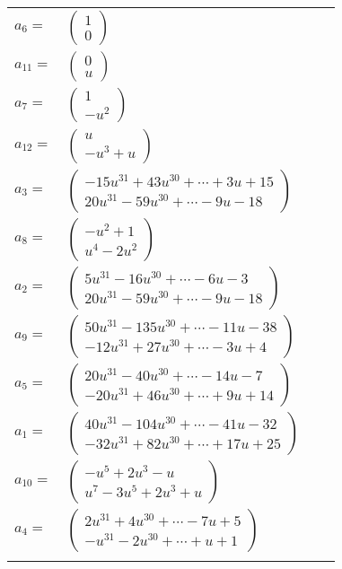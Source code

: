 \documentclass[1p]{elsarticle_modified}
\theoremstyle{definition}
\begin{document}
\begin{tabular}{m{7pt} m{180pt} m{7pt} m{180pt} }
\flushright $a_{6}=$&$\begin{pmatrix}1\\0\end{pmatrix}$ \\
\flushright $a_{11}=$&$\begin{pmatrix}0\\u\end{pmatrix}$ \\
\flushright $a_{7}=$&$\begin{pmatrix}1\\- u^2\end{pmatrix}$ \\
\flushright $a_{12}=$&$\begin{pmatrix}u\\- u^3+u\end{pmatrix}$ \\
\flushright $a_{3}=$&$\begin{pmatrix}-15 u^{31}+43 u^{30}+\cdots+3 u+15\\20 u^{31}-59 u^{30}+\cdots-9 u-18\end{pmatrix}$ \\
\flushright $a_{8}=$&$\begin{pmatrix}- u^2+1\\u^4-2 u^2\end{pmatrix}$ \\
\flushright $a_{2}=$&$\begin{pmatrix}5 u^{31}-16 u^{30}+\cdots-6 u-3\\20 u^{31}-59 u^{30}+\cdots-9 u-18\end{pmatrix}$ \\
\flushright $a_{9}=$&$\begin{pmatrix}50 u^{31}-135 u^{30}+\cdots-11 u-38\\-12 u^{31}+27 u^{30}+\cdots-3 u+4\end{pmatrix}$ \\
\flushright $a_{5}=$&$\begin{pmatrix}20 u^{31}-40 u^{30}+\cdots-14 u-7\\-20 u^{31}+46 u^{30}+\cdots+9 u+14\end{pmatrix}$ \\
\flushright $a_{1}=$&$\begin{pmatrix}40 u^{31}-104 u^{30}+\cdots-41 u-32\\-32 u^{31}+82 u^{30}+\cdots+17 u+25\end{pmatrix}$ \\
\flushright $a_{10}=$&$\begin{pmatrix}- u^5+2 u^3- u\\u^7-3 u^5+2 u^3+u\end{pmatrix}$ \\
\flushright $a_{4}=$&$\begin{pmatrix}2 u^{31}+4 u^{30}+\cdots-7 u+5\\- u^{31}-2 u^{30}+\cdots+u+1\end{pmatrix}$\\&\end{tabular}
\end{document}
